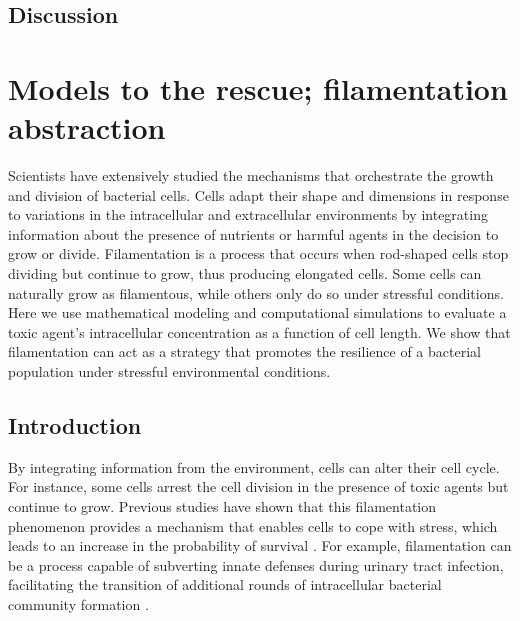 \documentclass[a4paper, nobind]{templates/ociamthesis}
\begin{document}
\hypertarget{discussion}{%
\section{Discussion}\label{discussion}}

\hypertarget{filamentation-abstraction}{%
\chapter{Models to the rescue; filamentation abstraction}\label{filamentation-abstraction}}

\minitoc 

\noindent Scientists have extensively studied the mechanisms that orchestrate the growth and division of bacterial cells. Cells adapt their shape and dimensions in response to variations in the intracellular and extracellular environments by integrating information about the presence of nutrients or harmful agents in the decision to grow or divide. Filamentation is a process that occurs when rod-shaped cells stop dividing but continue to grow, thus producing elongated cells. Some cells can naturally grow as filamentous, while others only do so under stressful conditions. Here we use mathematical modeling and computational simulations to evaluate a toxic agent's intracellular concentration as a function of cell length. We show that filamentation can act as a strategy that promotes the resilience of a bacterial population under stressful environmental conditions.

\hypertarget{introduction-2}{%
\section{Introduction}\label{introduction-2}}

By integrating information from the environment, cells can alter their cell cycle. For instance, some cells arrest the cell division in the presence of toxic agents but continue to grow. Previous studies have shown that this filamentation phenomenon provides a mechanism that enables cells to cope with stress, which leads to an increase in the probability of survival \autocite{justiceMorphologicalPlasticityBacterial2008}. For example, filamentation can be a process capable of subverting innate defenses during urinary tract infection, facilitating the transition of additional rounds of intracellular bacterial community formation \autocite{justiceFilamentationEscherichiaColi2006}.
\end{document}
